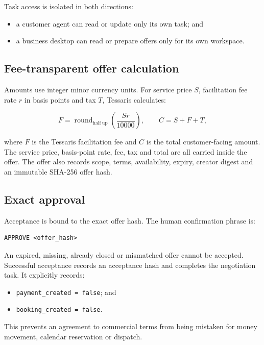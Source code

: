 \documentclass[11pt,a4paper]{article}
\newcommand{\code}[1]{\texttt{#1}}
\begin{document}
Task access is isolated in both directions:

\begin{itemize}
  \item a customer agent can read or update only its own task; and
  \item a business desktop can read or prepare offers only for its own
        workspace.
\end{itemize}

\subsection{Fee-transparent offer calculation}

Amounts use integer minor currency units.  For service price $S$, facilitation
fee rate $r$ in basis points and tax $T$, Tessaris calculates:

\[
F = \operatorname{round}_{\mathrm{half\ up}}\left(\frac{S r}{10000}\right),
\qquad
C = S + F + T,
\]

where $F$ is the Tessaris facilitation fee and $C$ is the total customer-facing
amount.  The service price, basis-point rate, fee, tax and total are all carried
inside the offer.  The offer also records scope, terms, availability, expiry,
creator digest and an immutable SHA-256 offer hash.

\subsection{Exact approval}

Acceptance is bound to the exact offer hash.  The human confirmation phrase is:

\begin{lstlisting}[style=tessaris]
APPROVE <offer_hash>
\end{lstlisting}

An expired, missing, already closed or mismatched offer cannot be accepted.
Successful acceptance records an acceptance hash and completes the negotiation
task.  It explicitly records:

\begin{itemize}
  \item \code{payment\_created = false}; and
  \item \code{booking\_created = false}.
\end{itemize}

This prevents an agreement to commercial terms from being mistaken for money
movement, calendar reservation or dispatch.
\end{document}
